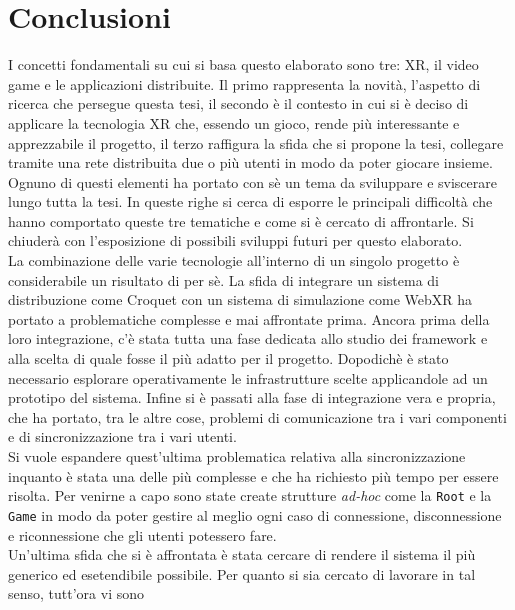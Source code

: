\chapter*{Conclusioni}
I concetti fondamentali su cui si basa questo elaborato sono tre: XR, il video game e le applicazioni distribuite. Il primo rappresenta la novità, l'aspetto di ricerca che persegue questa
tesi, il secondo è il contesto in cui si è deciso di applicare la tecnologia XR che, essendo un gioco, rende più interessante e apprezzabile il progetto, il terzo raffigura 
la sfida che si propone la tesi, collegare tramite una rete distribuita due o più utenti in modo da poter giocare insieme.\\
Ognuno di questi elementi ha portato con sè un tema da sviluppare e sviscerare lungo tutta la tesi. In queste righe si cerca di esporre le principali difficoltà che hanno comportato queste
tre tematiche e come si è cercato di affrontarle. Si chiuderà con l'esposizione di possibili sviluppi futuri per questo elaborato.\\
\newline
La combinazione delle varie tecnologie all'interno di un singolo progetto è considerabile un risultato di per sè. La sfida di integrare un sistema di distribuzione
come Croquet con un sistema di simulazione come WebXR ha portato a problematiche complesse e mai affrontate prima. Ancora prima della loro integrazione, c'è stata tutta una fase 
dedicata allo studio dei framework e alla scelta di quale fosse il più adatto per il progetto. Dopodichè è stato necessario esplorare operativamente le infrastrutture scelte 
applicandole ad un prototipo del sistema. Infine si è passati alla fase di integrazione vera e propria, che ha portato, tra le altre cose, problemi di comunicazione tra i vari 
componenti e di sincronizzazione tra i vari utenti.\\
Si vuole espandere quest'ultima problematica relativa alla sincronizzazione inquanto è stata una delle più complesse e che ha richiesto più tempo per essere risolta. Per venirne a 
capo sono state create strutture \textit{ad-hoc} come la \texttt{Root} e la \texttt{Game} in modo da poter gestire al meglio ogni caso di connessione, disconnessione e riconnessione 
che gli utenti potessero fare.\\
Un'ultima sfida che si è affrontata è stata cercare di rendere il sistema il più generico ed esetendibile possibile. Per quanto si sia cercato di lavorare in tal senso, tutt'ora vi sono
